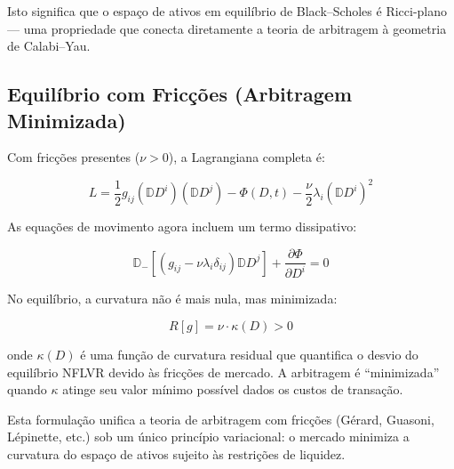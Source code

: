 Isto significa que o espa\c{c}o de ativos em equil\'ibrio de Black--Scholes \'e Ricci-plano --- uma propriedade que conecta diretamente a teoria de arbitragem \`a geometria de Calabi--Yau.

\subsection{Equil\'ibrio com Fric\c{c}\~oes (Arbitragem Minimizada)}

Com fric\c{c}\~oes presentes ($\nu > 0$), a Lagrangiana completa \'e:

\begin{equation}\label{eq:L-completa}
L = \frac{1}{2} g_{ij} (\mathbb{D}D^i)(\mathbb{D}D^j) - \Phi(D,t) - \frac{\nu}{2}\lambda_i (\mathbb{D}D^i)^2
\end{equation}

As equa\c{c}\~oes de movimento agora incluem um termo dissipativo:

\begin{equation}\label{eq:EL-friccao}
\mathbb{D}_-[(g_{ij} - \nu\lambda_i\delta_{ij})\mathbb{D}D^j] + \frac{\partial \Phi}{\partial D^i} = 0
\end{equation}

No equil\'ibrio, a curvatura n\~ao \'e mais nula, mas minimizada:

\begin{equation}\label{eq:curvatura-minima}
R[g] = \nu \cdot \kappa(D) > 0
\end{equation}

onde $\kappa(D)$ \'e uma fun\c{c}\~ao de curvatura residual que quantifica o desvio do equil\'ibrio NFLVR devido \`as fric\c{c}\~oes de mercado. A arbitragem \'e ``minimizada'' quando $\kappa$ atinge seu valor m\'inimo poss\'ivel dados os custos de transa\c{c}\~ao.

Esta formula\c{c}\~ao unifica a teoria de arbitragem com fric\c{c}\~oes (G\'erard, Guasoni, L\'epinette, etc.) sob um \'unico princ\'ipio variacional: o mercado minimiza a curvatura do espa\c{c}o de ativos sujeito \`as restri\c{c}\~oes de liquidez.

